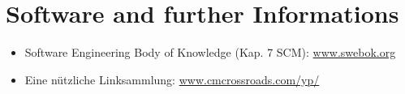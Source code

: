 \section{Software and further Informations}
\begin{itemize}
\item Software Engineering Body of Knowledge (Kap. 7 SCM):
  \href{http://www.swebok.org}{www.swebok.org}
\item Eine nützliche  Linksammlung: \href{http://www.cmcrossroads.com/yp}
                                          {www.cmcrossroads.com/yp/}
\end{itemize}
\newslide
%
